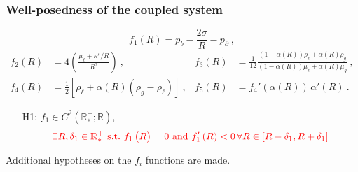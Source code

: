 \documentclass[10pt,aspectratio=169]{beamer}
\begin{document}

\begin{frame}
\frametitle{Well-posedness of the coupled system}
\begin{equation*}
	f_1\left(R\right)=p_b-\frac{2\sigma}{R}-p_\partial~,
\end{equation*}
\begin{align*}
f_2\left(R\right)&=4\left(\frac{\mu_\ell+\kappa^s/R}{R^2}\right)~,&f_3\left(R\right)&=\frac{1}{12}\frac{(1-\alpha\left(R\right))\rho_\ell+\alpha\left(R\right)\rho_g}{(1-\alpha\left(R\right))\mu_\ell+\alpha\left(R\right)\mu_g}~,\\ f_4\left(R\right)&=\frac{1}{2}\left[\rho_\ell+\alpha\left(R\right)\left(\rho_g-\rho_\ell\right)\right]~,&f_5\left(R\right)&=f_4'\left(\alpha\left(R\right)\right)\,\alpha'\left(R\right)~.
\end{align*}

\begin{itemize}
	\item[H1:] $f_1\in C^2\left(\mathbb{R}^+_*;\mathbb{R}\right)$, $${\color{red}\exists \bar{R},\delta_1\in\mathbb{R}^+_*~\text{s.t.}~f_1\left(\bar{R}\right)=0~\text{and}~f'_1\left(R\right)<0\, \forall R \in [\bar{R}-\delta_1,\bar{R}+\delta_1]}$$
\end{itemize}
Additional hypotheses on the $f_i$ functions are made.
\end{frame} 


\end{document}
